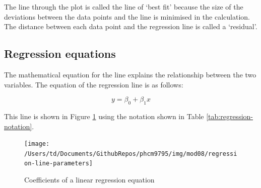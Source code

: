 \documentclass[
]{memoir}
\begin{document}
The line through the plot is called the line of `best fit' because the size of the deviations between the data points and the line is minimised in the calculation. The distance between each data point and the regression line is called a `residual'.

\hypertarget{regression-equations}{%
\subsection{Regression equations}\label{regression-equations}}

The mathematical equation for the line explains the relationship between the two variables. The equation of the regression line is as follows:

\[y = \beta_{0} + \beta_{1}x\]

This line is shown in Figure \ref{fig:regression-parameters} using the notation shown in Table \ref{tab:regression-notation}.

\begin{figure}
\texttt{[image: /Users/td/Documents/GithubRepos/phcm9795/img/mod08/regression-line-parameters]} \caption{Coefficients of a linear regression equation}\label{fig:regression-parameters}
\end{figure}

 
  \providecommand{\huxb}[2]{\arrayrulecolor[RGB]{#1}\global\arrayrulewidth=#2pt}
  \providecommand{\huxvb}[2]{\color[RGB]{#1}\vrule width #2pt}
  \providecommand{\huxtpad}[1]{\rule{0pt}{#1}}
  \providecommand{\huxbpad}[1]{\rule[-#1]{0pt}{#1}}
\end{document}

